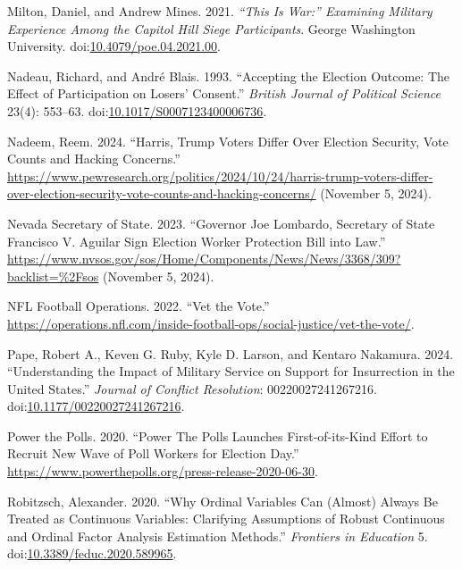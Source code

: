 \documentclass[
  12pt,
  letterpaper,
]{article}
\newlength{\cslhangindent}
\newenvironment{CSLReferences}[2] %
 {\begin{list}{}{%
  \setlength{\itemindent}{0pt}
  \setlength{\leftmargin}{0pt}
  \setlength{\parsep}{0pt}
  \ifodd #1
   \setlength{\leftmargin}{\cslhangindent}
   \setlength{\itemindent}{-1\cslhangindent}
  \fi
  \setlength{\itemsep}{#2\baselineskip}}}
 {\end{list}}
\begin{document}
\begin{CSLReferences}{1}{1}
Milton, Daniel, and Andrew Mines. 2021. \emph{{``{This} Is {War}:''}
{Examining Military Experience Among} the {Capitol Hill Siege
Participants}}. George Washington University.
doi:\href{https://doi.org/10.4079/poe.04.2021.00}{10.4079/poe.04.2021.00}.

Nadeau, Richard, and André Blais. 1993. {``Accepting the {Election
Outcome}: {The Effect} of {Participation} on {Losers}' {Consent}.''}
\emph{British Journal of Political Science} 23(4): 553--63.
doi:\href{https://doi.org/10.1017/S0007123400006736}{10.1017/S0007123400006736}.

Nadeem, Reem. 2024. {``Harris, {Trump Voters Differ Over Election
Security}, {Vote Counts} and {Hacking Concerns}.''}
\url{https://www.pewresearch.org/politics/2024/10/24/harris-trump-voters-differ-over-election-security-vote-counts-and-hacking-concerns/}
(November 5, 2024).

Nevada Secretary of State. 2023. {``Governor {Joe Lombardo}, {Secretary}
of {State Francisco V}. {Aguilar} Sign {Election Worker Protection Bill}
into Law.''}
\url{https://www.nvsos.gov/sos/Home/Components/News/News/3368/309?backlist=\%2Fsos}
(November 5, 2024).

NFL Football Operations. 2022. {``Vet the {Vote}.''}
\url{https://operations.nfl.com/inside-football-ops/social-justice/vet-the-vote/}.

Pape, Robert A., Keven G. Ruby, Kyle D. Larson, and Kentaro Nakamura.
2024. {``Understanding the {Impact} of {Military Service} on {Support}
for {Insurrection} in the {United States}.''} \emph{Journal of Conflict
Resolution}: 00220027241267216.
doi:\href{https://doi.org/10.1177/00220027241267216}{10.1177/00220027241267216}.

Power the Polls. 2020. {``Power {The Polls Launches First-of-its-Kind
Effort} to {Recruit New Wave} of {Poll Workers} for {Election Day}.''}
\url{https://www.powerthepolls.org/press-release-2020-06-30}.

Robitzsch, Alexander. 2020. {``Why {Ordinal Variables Can} ({Almost})
{Always Be Treated} as {Continuous Variables}: {Clarifying Assumptions}
of {Robust Continuous} and {Ordinal Factor Analysis Estimation
Methods}.''} \emph{Frontiers in Education} 5.
doi:\href{https://doi.org/10.3389/feduc.2020.589965}{10.3389/feduc.2020.589965}.


\end{CSLReferences}
\end{document}
